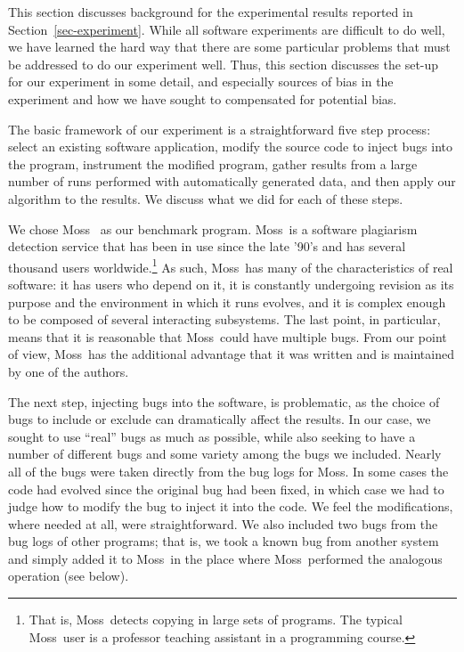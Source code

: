 \newcommand{\moss}{\smallcap Moss}

This section discusses background for the experimental results
reported in Section~\ref{sec-experiment}.  While all software
experiments are difficult to do well, we have learned the hard way
that there are some particular problems that must be addressed to do
our experiment well.  Thus, this section discusses the set-up for our
experiment in some detail, and especially sources of bias in the
experiment and how we have sought to compensated for potential bias.

The basic framework of our experiment is a straightforward five step
process: select an existing software application, modify the source
code to inject bugs into the program, instrument the modified program,
gather results from a large number of runs performed with
automatically generated data, and then apply our algorithm to the
results.  We discuss what we did for each of these steps.

We chose \moss\ \cite{SWA03} as our benchmark program.  \moss\ is a
software plagiarism detection service that has been in use since the
late '90's and has several thousand users worldwide.\footnote{That is,
\moss\ detects copying in large sets of programs.  The typical \moss\
user is a professor teaching assistant in a programming course.}  As
such, \moss\ has many of the characteristics of real software: it has
users who depend on it, it is constantly undergoing revision as its
purpose and the environment in which it runs evolves, and it is
complex enough to be composed of several interacting subsystems.  The
last point, in particular, means that it is reasonable that \moss\
could have multiple bugs.  From our point of view, \moss\ has the
additional advantage that it was written and is maintained by one of
the authors.

The next step, injecting bugs into the software, is problematic, as
the choice of bugs to include or exclude can dramatically affect the
results.  In our case, we sought to use ``real'' bugs as much as
possible, while also seeking to have a number of different bugs and
some variety among the bugs we included.  Nearly all of the bugs were
taken directly from the bug logs for \moss.  In some cases the code
had evolved since the original bug had been fixed, in which case we
had to judge how to modify the bug to inject it into the code.  We
feel the modifications, where needed at all, were straightforward.  We
also included two bugs from the bug logs of other programs; that is,
we took a known bug from another system and simply added it to \moss\
in the place where \moss\ performed the analogous operation (see
below).

